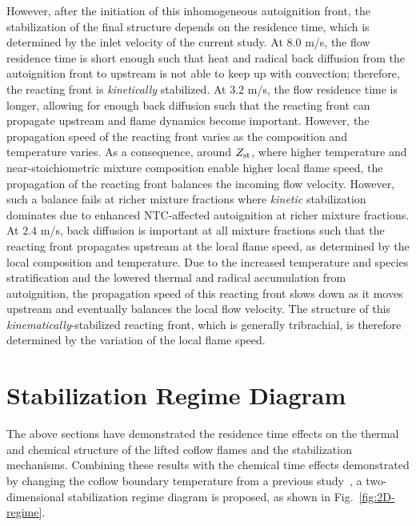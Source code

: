 \documentclass{wssci}
\begin{document}
However, after the initiation of this inhomogeneous autoignition front, the stabilization of the final structure depends on the residence time, which is determined by the inlet velocity of the current study.  At $8.0$ m/s, the flow residence time is short enough such that heat and radical back diffusion from the autoignition front to upstream is not able to keep up with convection; therefore, the reacting front is \emph{kinetically} stabilized.  At $3.2$ m/s, the flow residence time is longer, allowing for enough back diffusion such that the reacting front can propagate upstream and flame dynamics become important.  However, the propagation speed of the reacting front varies as the composition and temperature varies.  As a consequence, around $Z_{\rm st}$, where higher temperature and near-stoichiometric mixture composition enable higher local flame speed, the propagation of the reacting front balances the incoming flow velocity.  However, such a balance fails at richer mixture fractions where \emph{kinetic} stabilization dominates due to enhanced NTC-affected autoignition at richer mixture fractions.  At $2.4$ m/s, back diffusion is important at all mixture fractions such that the reacting front propagates upstream at the local flame speed, as determined by the local composition and temperature.  Due to the increased temperature and species stratification and the lowered thermal and radical accumulation from autoignition, the propagation speed of this reacting front slows down as it moves upstream and eventually balances the local flow velocity.  The structure of this \emph{kinematically}-stabilized reacting front, which is generally tribrachial, is therefore determined by the variation of the local flame speed.


        
\section{Stabilization Regime Diagram}

The above sections have demonstrated the residence time effects on the thermal and chemical structure of the lifted coflow flames and the stabilization mechanisms.  Combining these results with the chemical time effects demonstrated by changing the coflow boundary temperature from a previous study~\cite{deng15}, a two-dimensional stabilization regime diagram is proposed, as shown in Fig.~\ref{fig:2D-regime}.  
\end{document}
